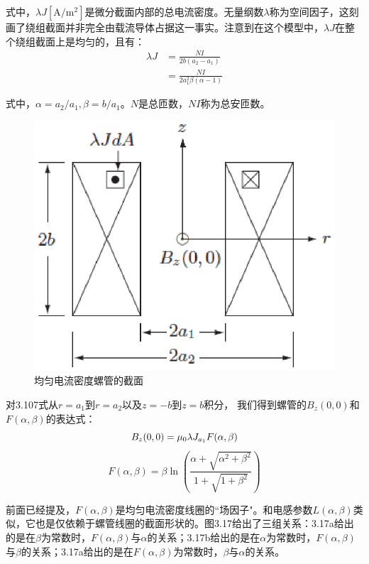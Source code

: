 式中，$\lambda J\mathrm{[A/m^2]}$是微分截面内部的总电流密度。无量纲数$\lambda$称为空间因子，这刻画了绕组截面并非完全由载流导体占据这一事实。注意到在这个模型中，$\lambda J$在整个绕组截面上是均匀的，且有：
\begin{subequations}
\begin{align}
\lambda J&=\frac{NI}{2b(a_2-a_1)}\\
&=\frac{NI}{2a_1^2\beta(\alpha-1)}%
\end{align}
\end{subequations}

式中，$\alpha=a_2/a_1,\beta=b/a_1$。$N$是总匝数，$NI$称为总安匝数。
\begin{figure}[htbp]
  \centering
 \includegraphics[scale=0.7]{chpt3/figs/fig3.16.eps}
  \caption{均匀电流密度螺管的截面}
\end{figure}

对3.107式从$r=a_1$到$r=a_2$以及$z=-b$到$z=b$积分，
我们得到螺管的$B_z(0,0)$和$F(\alpha,\beta)$的表达式：
\begin{equation}
B_z(0,0)=\mu_0\lambda J_{a_1}F(\alpha,\beta)\\ %
\end{equation}
\begin{equation*}
F(\alpha,\beta)=\beta \ln\left(\frac{\alpha+\sqrt{\alpha^2+\beta^2}}{1+\sqrt{1+\beta^2}}\right) \tag{3.13b}
\end{equation*}

前面已经提及，$F(\alpha,\beta)$是均匀电流密度线圈的``场因子"。和电感参数$L(\alpha,\beta)$类似，它也是仅依赖于螺管线圈的截面形状的。图3.17给出了三组关系：3.17a给出的是在$\beta$为常数时，$F(\alpha,\beta)$与$\alpha$的关系；3.17b给出的是在$\alpha$为常数时，$F(\alpha,\beta)$与$\beta$的关系；3.17a给出的是在$F(\alpha,\beta)$为常数时，$\beta$与$\alpha$的关系。


